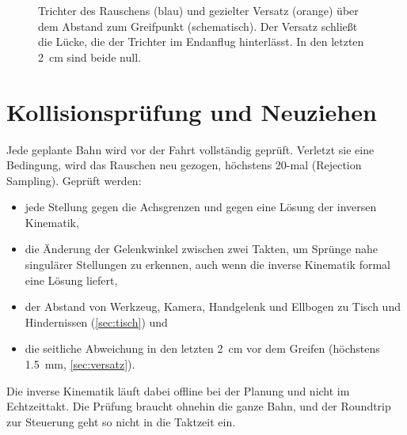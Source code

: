 \begin{figure}[htbp]
  \centering
  \caption[Trichter und gezielter Versatz über dem Abstand zum Greifpunkt]{Trichter des
  Rauschens (blau) und gezielter Versatz (orange) über dem Abstand zum Greifpunkt
  (schematisch). Der Versatz schließt die Lücke, die der Trichter im Endanflug hinterlässt. In
  den letzten \SI{2}{\centi\metre} sind beide null.}
  \label{fig:versatz}
\end{figure}

\section{Kollisionsprüfung und Neuziehen}
\label{sec:kollision}

Jede geplante Bahn wird vor der Fahrt vollständig geprüft. Verletzt sie eine Bedingung, wird
das Rauschen neu gezogen, höchstens 20-mal (Rejection Sampling). Geprüft werden:
\begin{itemize}
  \item jede Stellung gegen die Achsgrenzen und gegen eine Lösung der inversen Kinematik,
  \item die Änderung der Gelenkwinkel zwischen zwei Takten, um Sprünge nahe singulärer
    Stellungen zu erkennen, auch wenn die inverse Kinematik formal eine Lösung liefert,
  \item der Abstand von Werkzeug, Kamera, Handgelenk und Ellbogen zu Tisch und Hindernissen
    (\cref{sec:tisch}) und
  \item die seitliche Abweichung in den letzten \SI{2}{\centi\metre} vor dem Greifen
    (höchstens \SI{1.5}{\milli\metre}, \cref{sec:versatz}).
\end{itemize}
Die inverse Kinematik läuft dabei offline bei der Planung und nicht im Echtzeittakt. Die
Prüfung braucht ohnehin die ganze Bahn, und der Roundtrip zur Steuerung geht so nicht in die
Taktzeit ein.

